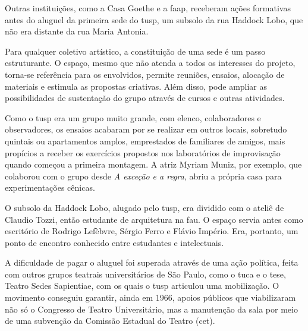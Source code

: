 Outras instituições, como a Casa Goethe e a {\sc faap}, receberam ações
formativas antes do aluguel da primeira sede do {\sc tusp}, um subsolo da rua
Haddock Lobo, que não era distante da rua Maria Antonia.

Para qualquer coletivo artístico, a constituição de uma sede é um passo
estruturante. O espaço, mesmo que não atenda a todos os interesses do
projeto, torna-se referência para os envolvidos, permite reuniões,
ensaios, alocação de materiais e estimula as propostas criativas. Além
disso, pode ampliar as possibilidades de sustentação do grupo através de
cursos e outras atividades.

Como o {\sc tusp} era um grupo muito grande, com elenco, colaboradores e
observadores, os ensaios acabaram por se realizar em outros locais,
sobretudo quintais ou apartamentos amplos, emprestados de familiares de
amigos, mais propícios a receber os exercícios propostos nos
laboratórios de improvisação quando começou a primeira montagem. A atriz
Myriam Muniz, por exemplo, que colaborou com o grupo desde {\it A
exceção e a regra}, abriu a própria casa para experimentações cênicas.

O subsolo da Haddock Lobo, alugado pelo {\sc tusp}, era dividido com o ateliê
de Claudio Tozzi, então estudante de arquitetura na {\sc fau}. O espaço servia
antes como escritório de Rodrigo Lefèbvre, Sérgio Ferro e Flávio
Império. Era, portanto, um ponto de encontro conhecido entre estudantes
e intelectuais.


A dificuldade de pagar o aluguel foi superada através de uma ação
política, feita com outros grupos teatrais universitários de São Paulo,
como o {\sc tuca} e o {\sc tese}, Teatro Sedes Sapientiae, com os quais o {\sc tusp}
articulou uma mobilização. O movimento conseguiu garantir, ainda em
1966, apoios públicos que viabilizaram não só o Congresso de Teatro
Universitário, mas a manutenção da sala por meio de uma subvenção da
Comissão Estadual do Teatro ({\sc cet}).

